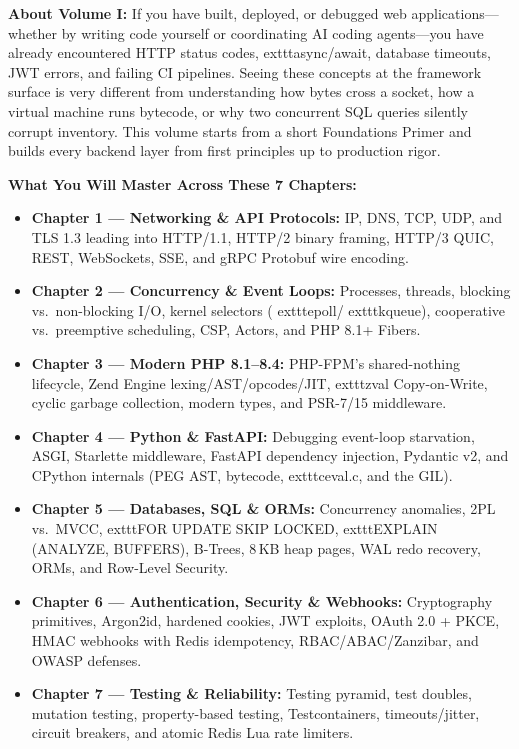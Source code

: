\documentclass[11pt,oneside]{book}
\begin{document}
\begin{tcolorbox}[
  enhanced,
  colback=white,
  colframe=gray!30!white,
  boxrule=0.8pt,
  arc=2pt,
  left=15pt,right=15pt,top=12pt,bottom=12pt
]
\sffamily\small
\textbf{About Volume I:}
If you have built, deployed, or debugged web applications---whether by writing code yourself or coordinating AI coding agents---you have already encountered HTTP status codes, 	exttt{async/await}, database timeouts, JWT errors, and failing CI pipelines. Seeing these concepts at the framework surface is very different from understanding how bytes cross a socket, how a virtual machine runs bytecode, or why two concurrent SQL queries silently corrupt inventory. This volume starts from a short Foundations Primer and builds every backend layer from first principles up to production rigor.

\vspace{6pt}
\textbf{What You Will Master Across These 7 Chapters:}
\begin{itemize}[leftmargin=15pt,itemsep=3pt]
  \item \textbf{Chapter 1 --- Networking \& API Protocols:} IP, DNS, TCP, UDP, and TLS 1.3 leading into HTTP/1.1, HTTP/2 binary framing, HTTP/3 QUIC, REST, WebSockets, SSE, and gRPC Protobuf wire encoding.
  \item \textbf{Chapter 2 --- Concurrency \& Event Loops:} Processes, threads, blocking vs.\ non-blocking I/O, kernel selectors (	exttt{epoll}/	exttt{kqueue}), cooperative vs.\ preemptive scheduling, CSP, Actors, and PHP 8.1+ Fibers.
  \item \textbf{Chapter 3 --- Modern PHP 8.1--8.4:} PHP-FPM's shared-nothing lifecycle, Zend Engine lexing/AST/opcodes/JIT, 	exttt{zval} Copy-on-Write, cyclic garbage collection, modern types, and PSR-7/15 middleware.
  \item \textbf{Chapter 4 --- Python \& FastAPI:} Debugging event-loop starvation, ASGI, Starlette middleware, FastAPI dependency injection, Pydantic v2, and CPython internals (PEG AST, bytecode, 	exttt{ceval.c}, and the GIL).
  \item \textbf{Chapter 5 --- Databases, SQL \& ORMs:} Concurrency anomalies, 2PL vs.\ MVCC, 	exttt{FOR UPDATE SKIP LOCKED}, 	exttt{EXPLAIN (ANALYZE, BUFFERS)}, B-Trees, 8\,KB heap pages, WAL redo recovery, ORMs, and Row-Level Security.
  \item \textbf{Chapter 6 --- Authentication, Security \& Webhooks:} Cryptography primitives, Argon2id, hardened cookies, JWT exploits, OAuth 2.0 + PKCE, HMAC webhooks with Redis idempotency, RBAC/ABAC/Zanzibar, and OWASP defenses.
  \item \textbf{Chapter 7 --- Testing \& Reliability:} Testing pyramid, test doubles, mutation testing, property-based testing, Testcontainers, timeouts/jitter, circuit breakers, and atomic Redis Lua rate limiters.
\end{itemize}
\end{tcolorbox}
\end{document}
